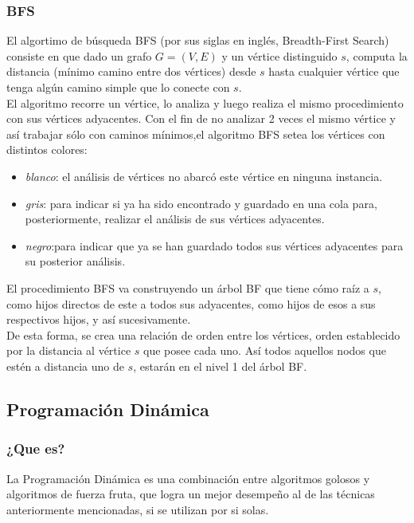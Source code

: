 \subsubsection{BFS}
El algortimo de búsqueda BFS (por sus siglas en inglés, Breadth-First Search)
consiste en que dado un grafo $G= (V,E)$ y un vértice distinguido $s$, computa
la distancia (mínimo camino entre dos vértices) desde $s$ hasta cualquier
vértice que tenga algún camino simple que lo conecte con $s$.\\
\indent El algoritmo recorre un vértice, lo analiza y luego realiza el mismo
procedimiento con sus vértices adyacentes. Con el fin de no analizar 2 veces el
mismo vértice y así trabajar sólo con caminos mínimos,el algoritmo BFS setea los
vértices con distintos colores:

\begin{itemize}
\item \textit{blanco}: el análisis de vértices no abarcó este vértice en ninguna
instancia.
\item \textit{gris}: para indicar si ya ha sido encontrado y guardado en una
cola para, posteriormente, realizar el análisis de sus vértices adyacentes.
\item \textit{negro}:para indicar que ya se han guardado todos sus vértices
adyacentes para su posterior análisis.
\end{itemize}

El procedimiento BFS va construyendo un árbol BF que tiene cómo raíz a
$s$, como hijos directos de este a todos sus adyacentes, como hijos de esos a
sus respectivos hijos, y así sucesivamente.\\
\indent De esta forma, se crea una relación de orden entre los vértices, orden
establecido por la distancia al vértice $s$ que posee cada uno. Así todos
aquellos nodos que estén a distancia uno de $s$, estarán en el nivel 1 del árbol
BF.

\clearpage

\subsection{Programación Dinámica}

\subsubsection{¿Que es?}
\indent La Programación Dinámica es una combinación entre algoritmos golosos y algoritmos de fuerza fruta, que logra un mejor desempeño al de las técnicas anteriormente mencionadas, si se utilizan por si solas.

